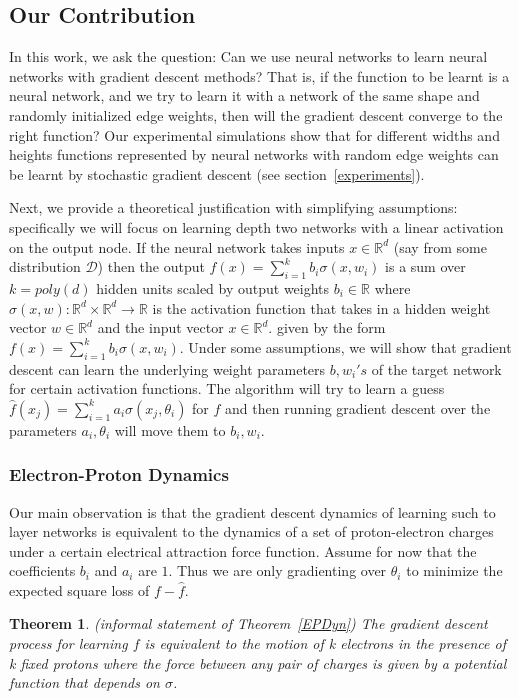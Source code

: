 \documentclass{article}
\newtheorem{theorem}{Theorem}[section]
\newcommand{\R}{{\mathbb{R}}}
\begin{document}
\subsection{Our Contribution}


In this work, we ask the question: Can we use neural networks to learn neural networks with gradient descent methods? That is, if the function to be learnt is a neural network, and we try to learn it with a network of the same shape and randomly initialized edge weights, then will the gradient descent converge to the right function? Our experimental simulations show that for different widths and heights functions represented by neural networks with random edge weights can be learnt by stochastic gradient descent (see section~\ref{experiments}).

Next, we provide a theoretical justification with simplifying assumptions: specifically we will focus on learning depth two networks with a linear activation on the output node. If the neural network takes inputs  $x \in \R^d$ (say from some distribution $\mathcal{D}$) then the output $f(x) = \sum_{i=1}^k b_i\sigma(x,w_i)$ is a sum over $k = poly(d)$ hidden units scaled by output weights $b_i \in \R$ where $\sigma(x,w):\R^d \times \R^d\to \R$ is the activation function that takes in a hidden weight vector $w \in \R^d$ and the input vector $x \in \R^d$.
given by the form $f(x) = \sum_{i=1}^k b_i\sigma(x,w_i)$. Under some assumptions, we will show that gradient descent can learn the underlying weight parameters $b, w_i's$ of the target network for certain activation functions. The algorithm will try to learn a guess $\widehat{f}(x_j) = \sum_{i=1}^k a_i \sigma(x_j,\theta_i)$ for $f$ and then running gradient descent over the parameters $a_i, \theta_i$ will move them to $b_i, w_i$. 

\subsubsection{Electron-Proton Dynamics}

Our main observation is that the gradient descent dynamics of learning such to layer networks is equivalent to the dynamics of a set of proton-electron charges under a certain electrical attraction force function. Assume for now that the coefficients $b_i$ and $a_i$ are $1$. Thus we are only gradienting over $\theta_i$ to minimize the expected square loss of $f-\widehat{f}$.

\begin{theorem}(informal statement of Theorem~\ref{EPDyn})
The gradient descent process for learning $f$ is equivalent to the motion of k electrons in the presence of k fixed protons where the force between any pair of charges is given by a potential function that depends on $\sigma$.
\end{theorem}
\end{document}
